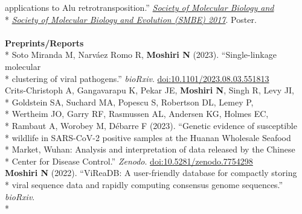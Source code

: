 \documentclass[margin,line]{res}
\begin{document}
\begin{resume}
\hspace*{9mm} applications to Alu retrotransposition.'' \href{https://smbe.org/smbe/}{\textit{Society of Molecular Biology and}}\\*\vspace{2mm}
\hspace*{8mm} \href{https://smbe.org/smbe/}{\textit{Society of Molecular Biology and Evolution (SMBE) 2017}}. Poster.\\
~\\
\textbf{Preprints/Reports}\vspace{2mm}\\*
\hspace*{4mm} Soto Miranda M, Narv\'{a}ez Romo R, \textbf{Moshiri N} (2023). ``Single-linkage molecular\\*\vspace{2mm}
\hspace*{8mm} clustering of viral pathogens.'' \textit{bioRxiv}. \href{https://doi.org/10.1101/2023.08.03.551813}{doi:10.1101/2023.08.03.551813}\\
\hspace*{4mm} Crits-Christoph A, Gangavarapu K, Pekar JE, \textbf{Moshiri N}, Singh R, Levy JI,\\*
\hspace*{9mm} Goldstein SA, Suchard MA, Popescu S, Robertson DL, Lemey P,\\*
\hspace*{9mm} Wertheim JO, Garry RF, Rasmussen AL, Andersen KG, Holmes EC,\\*
\hspace*{9mm} Rambaut A, Worobey M, D\'ebarre F (2023). ``Genetic evidence of susceptible\\*
\hspace*{9mm} wildlife in SARS-CoV-2 positive samples at the Huanan Wholesale Seafood\\*
\hspace*{9mm} Market, Wuhan: Analysis and interpretation of data released by the Chinese\\*\vspace{2mm}
\hspace*{8mm} Center for Disease Control.'' \textit{Zenodo}. \href{https://doi.org/10.5281/zenodo.7754298}{doi:10.5281/zenodo.7754298}\\
\hspace*{4mm} \textbf{Moshiri N} (2022). ``ViReaDB: A user-friendly database for compactly storing\\*
\hspace*{9mm} viral sequence data and rapidly computing consensus genome sequences.'' \textit{bioRxiv}.\\*\vspace{2mm}

\end{resume}
\end{document}
